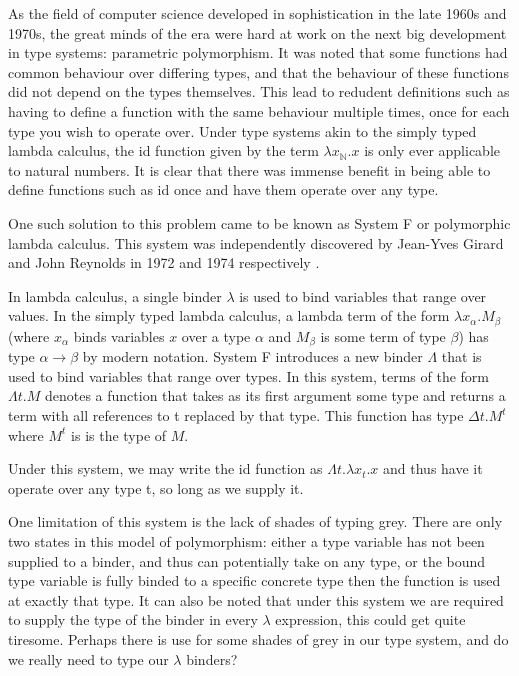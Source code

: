 \documentclass{ProgressReport}[2020/09/15]
\begin{document}
          As the field of computer science developed in sophistication in
          the late 1960s and 1970s, the great minds of the era were hard at
          work on the next big development in type systems: parametric
          polymorphism. It was noted that some functions had common
          behaviour over differing types, and that the behaviour of these
          functions did not depend on the types themselves. This lead to
          redudent definitions such as having to define a function with the
          same behaviour multiple times, once for each type you wish to
          operate over. Under type systems akin to the simply typed lambda
          calculus, the id function given by the term $\lambda
          x_{\mathbb{N}}.x $ is only ever applicable to natural numbers. It
          is clear that there was immense benefit in being able to define
          functions such as id once and have them operate over any type.
      
          One such solution to this problem came to be known as System F
          or polymorphic lambda calculus. This system was independently
          discovered by Jean-Yves Girard and John Reynolds in 1972 and 1974
          respectively \cite{Girard1972,reynolds1974}.
      
          In lambda calculus, a single binder $\lambda$ is used to bind variables
          that range over values. In the simply typed lambda calculus, a
          lambda term of the form $\lambda x_{\alpha}.M_{\beta}$ (where
          $x_{\alpha}$ binds variables $x$ over a type $\alpha$ and
          $M_{\beta}$ is some term of type $\beta $) has type
          $\alpha\to\beta$ by modern notation. System F introduces a new
          binder $\Lambda$ that is used to bind variables that range over
          types. In this system, terms of the form $\Lambda t.M$ denotes a
          function that takes as its first argument some type and returns a
          term with all references to t replaced by that type. This function
          has type $\Delta t.M^{t}$ where $M^t$ is is the type of $M$.
      
          Under this system, we may write the id function as $\Lambda t
          . \lambda x_t . x$ and thus have it operate over any type t,
          so long as we supply it.
      
          One limitation of this system is the lack of shades of typing
          grey. There are only two states in this model of polymorphism:
          either a type variable has not been supplied to a binder,
          and thus can potentially take on any type, or the bound type
          variable is fully binded to a specific concrete type then the
          function is used at exactly that type. It can also be noted that under
          this system we are required to supply the type of the binder in
          every $\lambda$ expression, this could get quite tiresome. Perhaps
          there is use for some shades of grey in our type system, and do we
          really need to type our $\lambda$ binders?
\end{document}
